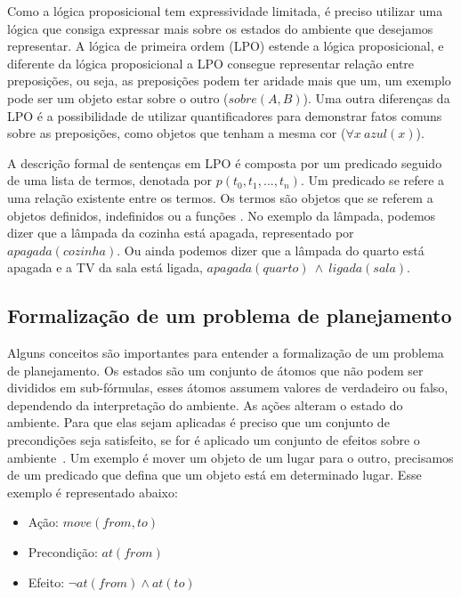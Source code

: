 Como a lógica proposicional tem expressividade limitada, é preciso utilizar uma lógica que consiga expressar mais sobre os estados do ambiente que desejamos representar. 
A lógica de primeira ordem (LPO) estende a lógica proposicional, e diferente da lógica proposicional a LPO consegue representar relação entre preposições, ou seja, as preposições podem ter aridade mais que um, um exemplo pode ser um objeto estar sobre o outro ($sobre(A,B)$). Uma outra diferenças da LPO é a possibilidade de utilizar quantificadores para demonstrar fatos comuns sobre as preposições, como objetos que tenham a mesma cor ($\forall x~ azul(x)$).

A descrição formal de sentenças em LPO é composta por um predicado seguido de uma lista de termos, denotada por $p(t_{0}, t_{1}, ..., t_{n})$. 
Um predicado se refere a uma relação existente entre os termos. 
Os termos são objetos que se referem a objetos definidos, indefinidos ou a funções \cite{intelligence2003modern}. 
No exemplo da lâmpada, podemos dizer que a lâmpada da cozinha está apagada, representado por $apagada(cozinha)$. 
Ou ainda podemos dizer que a lâmpada do quarto está apagada e a TV da sala está ligada, $apagada(quarto)~ \wedge~ ligada(sala)$.  

\subsection{Formalização de um problema de planejamento}

Alguns conceitos são importantes para entender a formalização de um problema de planejamento. 
Os estados são um conjunto de átomos que não podem ser divididos em sub-fórmulas, esses átomos assumem valores de verdadeiro ou falso, dependendo da interpretação do ambiente.
As ações alteram o estado do ambiente. Para que elas sejam aplicadas é preciso que um conjunto de precondições seja satisfeito, se for é aplicado um conjunto de efeitos sobre o ambiente~\cite[Capítulo 10]{intelligence2003modern}.
Um exemplo é mover um objeto de um lugar para o outro, precisamos de um predicado que defina que um objeto está em determinado lugar. Esse exemplo é representado abaixo:

\begin{itemize}
	\item Ação: $move(from, to)$
	\item Precondição: $at(from)$
	\item Efeito: $\neg at(from) \wedge at(to)$
\end{itemize}

